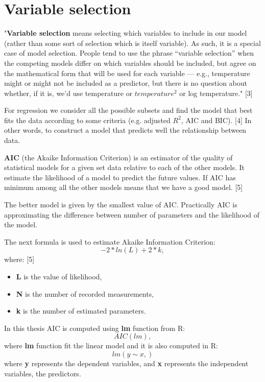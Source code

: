 \chapter{Variable selection}
\label{problem}
{"\textbf{Variable  selection}  means  selecting  which  variables  to  include  in  our  model (rather than some sort of selection which is itself variable). As such, it is a special case of model selection.  People tend to use the phrase “variable selection” when the competing models differ on which variables should be included, but agree on the mathematical form that will be used for each variable — e.g., temperature might or might not be included as a predictor, but there is no question about whether, if it is, we’d use temperature or $temperature ^ 2$ or log temperature."} [3]

For regression we consider all the possible subsets and find the model that best fits the data according to some criteria \big(e.g. adjusted $R^2$, AIC and BIC). [4]
In other words, to construct a model that predicts well the relationship between data.

\textbf{AIC} \big(the Akaike Information Criterion) is an estimator of the quality of statistical models for a given set data relative to each of the other models. It estimate the likelihood of a model to predict the future values. 
If AIC has minimum among all the other models means that we have a good model. [5]

The better model is given by the smallest value of AIC. Practically AIC is approximating the difference between number of parameters and the likelihood of the model.

The next formula is used to estimate Akaike Information Criterion:
\textbf{$$-2 * ln(L) + 2 * k,$$}
where: [5]
\begin{itemize}
	\item \textbf{L} is the value of likelihood,
	\item \textbf{N} is the number of recorded measurements,
	\item  \textbf{k} is the number of estimated parameters.
\end{itemize}

In this thesis AIC is computed using \textbf{lm} function from R:
$$AIC(lm),$$
where \textbf{lm} function fit the linear model and it is also computed in R:
$$lm(y \sim x,)$$
where \textbf{y} represents the dependent variables, and \textbf{x} represents the independent variables, the predictors.

